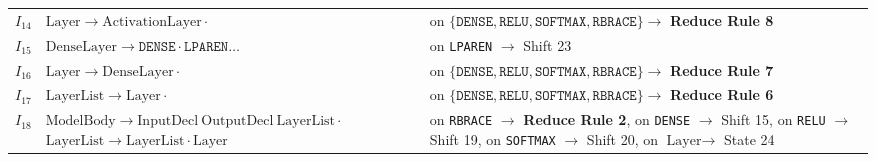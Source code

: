 \documentclass[11pt,a4paper]{article}
\begin{document}
\begin{table}[htbp]
\begin{tabular}{cp{6.5cm}p{5.5cm}}
$I_{14}$ & $\text{Layer} \rightarrow \text{ActivationLayer} \cdot$ & on $\{\texttt{DENSE}, \texttt{RELU}, \texttt{SOFTMAX}, \texttt{RBRACE}\} \rightarrow$ \textbf{Reduce Rule 8} \\
$I_{15}$ & $\text{DenseLayer} \rightarrow \texttt{DENSE} \cdot \texttt{LPAREN} \dots$ & on \texttt{LPAREN} $\rightarrow$ Shift 23 \\
$I_{16}$ & $\text{Layer} \rightarrow \text{DenseLayer} \cdot$ & on $\{\texttt{DENSE}, \texttt{RELU}, \texttt{SOFTMAX}, \texttt{RBRACE}\} \rightarrow$ \textbf{Reduce Rule 7} \\
$I_{17}$ & $\text{LayerList} \rightarrow \text{Layer} \cdot$ & on $\{\texttt{DENSE}, \texttt{RELU}, \texttt{SOFTMAX}, \texttt{RBRACE}\} \rightarrow$ \textbf{Reduce Rule 6} \\
$I_{18}$ & $\text{ModelBody} \rightarrow \text{InputDecl} \ \text{OutputDecl} \ \text{LayerList} \cdot$ \newline $\text{LayerList} \rightarrow \text{LayerList} \cdot \text{Layer}$ & on \texttt{RBRACE} $\rightarrow$ \textbf{Reduce Rule 2}, on \texttt{DENSE} $\rightarrow$ Shift 15, on \texttt{RELU} $\rightarrow$ Shift 19, on \texttt{SOFTMAX} $\rightarrow$ Shift 20, on $\text{Layer} \rightarrow$ State 24 \\
\bottomrule
\end{tabular}
\end{table}
\end{document}
